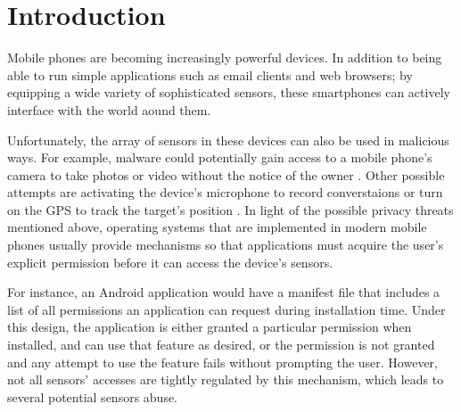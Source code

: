 \documentclass[11pt,conference]{IEEEtran}
\begin{document}
\begin{abstract}
[to - fill]
\end{abstract}





%
\IEEEpeerreviewmaketitle



\section{Introduction}
\label{sec:introduction}
\noindent Mobile phones are becoming increasingly powerful
devices. In addition to being able to run simple applications such as email clients and web browsers; by equipping a wide variety of sophisticated sensors, these smartphones can actively interface with the world aound them.

Unfortunately, the array of sensors in these devices can also be
used in malicious ways. For example, malware could
potentially gain access to a mobile phone's camera to take photos or
video without the notice of the owner \cite{cheng2007mobile}. Other possible attempts are activating the device's microphone to record converstaions or turn on the GPS to track the target's position
\cite{dagon2004mobile, cai2009defending, enck2010taintdroid, egele2011pios}.
In light of the possible privacy threats mentioned above, operating systems that are implemented in modern mobile phones usually provide mechanisms so that applications must acquire the user's explicit permission before it can access the device's sensors.

For instance, an Android application would have a manifest file that includes a list of all permissions an application can request during installation time. Under this design, the application is either granted a particular permission when installed, and can use that feature as desired, or the permission is not granted and any attempt to use the feature fails without prompting the user. However, not all sensors' accesses are tightly regulated by this mechanism, which leads to several potential sensors abuse.
\end{document}
